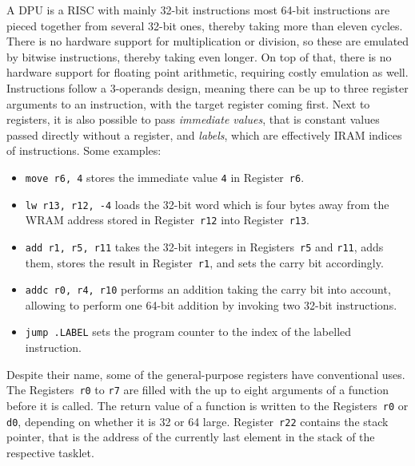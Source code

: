 A \ac{DPU} is a \ac{RISC} with mainly 32-bit instructions \Dash most 64-bit instructions are pieced together from several 32-bit ones, thereby taking more than eleven cycles.
There is no hardware support for multiplication or division, so these are emulated by bitwise instructions, thereby taking even longer.
On top of that, there is no hardware support for floating point arithmetic, requiring costly emulation as well.
Instructions follow a 3-operands design, meaning there can be up to three register arguments to an instruction, with the target register coming first.
Next to registers, it is also possible to pass \emph{immediate values}, that is constant values passed directly without a register, and \emph{labels}, which are effectively \ac{IRAM} indices of instructions.
Some examples:
\begin{itemize}
	\item
	\lstinline|move r6, 4| stores the immediate value \lstinline|4| in Register~\lstinline|r6|.

	\item
	\lstinline|lw r13, r12, -4| loads the 32-bit word which is four bytes away from the \ac{WRAM} address stored in Register~\lstinline|r12| into Register~\lstinline|r13|.

	\item
	\lstinline|add r1, r5, r11| takes the 32-bit integers in Registers~\lstinline|r5| and \lstinline|r11|, adds them, stores the result in Register~\lstinline|r1|, and sets the carry bit accordingly.

	\item
	\lstinline|addc r0, r4, r10| performs an addition taking the carry bit into account, allowing to perform one 64-bit addition by invoking two 32-bit instructions.

	\item
	\lstinline|jump .LABEL| sets the program counter to the index of the labelled instruction.
\end{itemize}
Despite their name, some of the general-purpose registers have conventional uses.
The Registers~\lstinline|r0| to \lstinline|r7| are filled with the up to eight arguments of a function before it is called.
The return value of a function is written to the Registers~\lstinline|r0| or \lstinline|d0|, depending on whether it is \qty{32}{\bit} or \qty{64}{\bit} large.
Register~\lstinline|r22| contains the stack pointer, that is the address of the currently last element in the stack of the respective tasklet.
